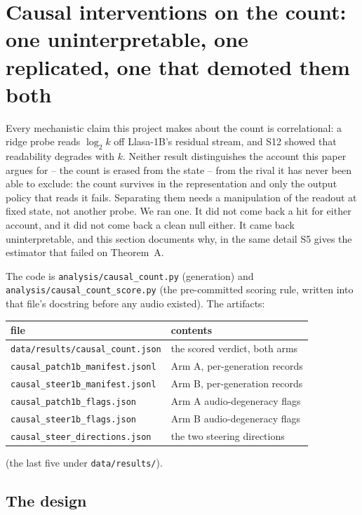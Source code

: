 \documentclass[11pt]{article}
\begin{document}
\section{Causal interventions on the count: one uninterpretable, one replicated, one that demoted them both}
\label{sec:s26}

Every mechanistic claim this project makes about the count is correlational: a
ridge probe reads $\log_2 k$ off Llasa-1B's residual stream, and S12
showed that readability degrades with $k$. Neither result distinguishes the
account this paper argues for -- the count is erased from the state -- from the
rival it has never been able to exclude: the count survives in the
representation and only the output policy that reads it fails. Separating them
needs a manipulation of the readout at fixed state, not another probe. We ran
one. It did not come back a hit for either account, and it did not come back a
clean null either. It came back uninterpretable, and this section documents why,
in the same detail S5 gives the estimator that failed on Theorem~A.

The code is \texttt{analysis/causal\_count.py} (generation) and
\texttt{analysis/causal\_count\_score.py} (the pre-committed scoring rule,
written into that file's docstring before any audio existed). The artifacts:

\begin{center}
\begin{tabular}{@{}ll@{}}
\toprule
file & contents \\
\midrule
\texttt{data/results/causal\_count.json} & the scored verdict, both arms \\
\texttt{causal\_patch1b\_manifest.jsonl} & Arm A, per-generation records \\
\texttt{causal\_steer1b\_manifest.jsonl} & Arm B, per-generation records \\
\texttt{causal\_patch1b\_flags.json} & Arm A audio-degeneracy flags \\
\texttt{causal\_steer1b\_flags.json} & Arm B audio-degeneracy flags \\
\texttt{causal\_steer\_directions.json} & the two steering directions \\
\bottomrule
\end{tabular}
\end{center}

\noindent (the last five under \texttt{data/results/}).

\subsection{The design}
\end{document}
